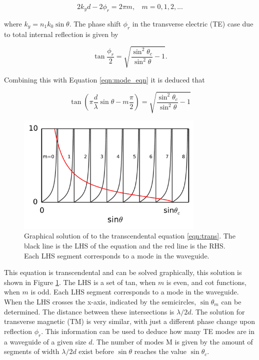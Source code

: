 \begin{equation}\label{eqn:mode_eqn} 2 k_y d - 2 \phi_r = 2\pi m, \ \ \ \ m =
\mathrm{0, 1, 2,...} \end{equation}

where $k_y = n_1 k_0 \sin{\theta}$. The phase shift $\phi_r$ in the transverse
electric (TE) case due to total internal reflection is given by

\begin{equation} \tan{\frac{\phi_r}{2}} =
\sqrt{\frac{\sin^2\theta_c}{\sin^2\theta} - 1}. \end{equation}

Combining this with Equation \ref{eqn:mode_eqn} it is deduced that

\begin{equation}\label{eqn:trans} \tan \left( \pi \frac{d}{\lambda} \sin \theta -
m \frac{\pi}{2} \right) = \sqrt{\frac{\sin^2\theta_c}{\sin^2\theta} - 1}
\end{equation}

\begin{figure}[h!] \begin{center}
\includegraphics[width=0.8\textwidth]{images/mode.pdf} \end{center}
\caption{
Graphical solution of to the transcendental equation \ref{eqn:trans}. The black line is the
LHS of the equation and the red line is the RHS. Each LHS segment corresponds to
a mode in the waveguide.
} \label{fig:mode} \end{figure}

This equation is transcendental and can be solved graphically, this solution is
shown in Figure \ref{fig:mode}. The LHS is a set of tan, when $m$ is even, and
cot functions, when $m$ is odd. Each LHS segment corresponds to a mode in the
waveguide. When the LHS crosses the x-axis, indicated by the semicircles, $\sin
\theta_m$ can be determined. The distance between these intersections is
$\lambda/2d$. The solution for transverse magnetic (TM) is very similar, with
just a different phase change upon reflection $\phi_r$. This information can be
used to deduce how many TE modes are in a waveguide of a given size $d$. The
number of modes M is given by the amount of segments of width $\lambda/2d$ exist
before $\sin \theta$ reaches the value $\sin \theta_c$.


